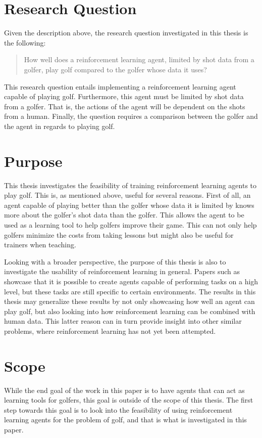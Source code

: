 \documentclass{kththesis}
\begin{document}
\section{Research Question}
Given the description above, the research question investigated in this thesis is the following:
\begin{quote}
    How well does a reinforcement learning agent, limited by shot data from a golfer, play golf compared to the golfer whose data it uses?
\end{quote}
This research question entails implementing a reinforcement learning agent capable of playing golf. Furthermore, this agent must be limited by shot data from a golfer. That is, the actions of the agent will be dependent on the shots from a human. Finally, the question requires a comparison between the golfer and the agent in regards to playing golf. 

\section{Purpose}
This thesis investigates the feasibility of training reinforcement learning agents to play golf. This is, as mentioned above, useful for several reasons. First of all, an agent capable of playing better than the golfer whose data it is limited by knows more about the golfer's shot data than the golfer. This allows the agent to be used as a learning tool to help golfers improve their game. This can not only help golfers minimize the costs from taking lessons but might also be useful for trainers when teaching.

Looking with a broader perspective, the purpose of this thesis is also to investigate the usability of reinforcement learning in general. Papers such as \textcite{mnih2015human} showcase that it is possible to create agents capable of performing tasks on a high level, but these tasks are still specific to certain environments. The results in this thesis may generalize these results by not only showcasing how well an agent can play golf, but also looking into how reinforcement learning can be combined with human data. This latter reason can in turn provide insight into other similar problems, where reinforcement learning has not yet been attempted. 

\section{Scope}
While the end goal of the work in this paper is to have agents that can act as learning tools for golfers, this goal is outside of the scope of this thesis. The first step towards this goal is to look into the feasibility of using reinforcement learning agents for the problem of golf, and that is what is investigated in this paper.
\end{document}
